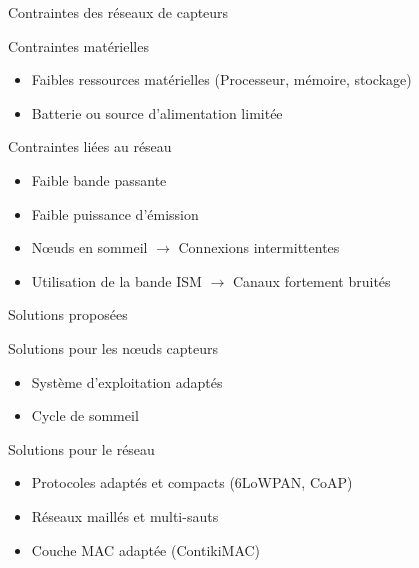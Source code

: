 \begin{frame}{Contraintes des réseaux de capteurs}

  \begin{block}{Contraintes matérielles}
    \begin{itemize}
      \item Faibles ressources matérielles (Processeur, mémoire, stockage)
      \item Batterie ou source d'alimentation limitée
    \end{itemize}
  \end{block}  

  \begin{block}{Contraintes liées au réseau}
    \begin{itemize}
      \item Faible bande passante
      \item Faible puissance d'émission
      \item Nœuds en sommeil $\to$ Connexions intermittentes
      \item Utilisation de la bande ISM $\to$ Canaux fortement bruités
    \end{itemize}
  \end{block}

\end{frame}

\begin{frame}{Solutions proposées}

  \begin{block}{Solutions pour les nœuds capteurs}
    \begin{itemize}
      \item Système d'exploitation adaptés
      \item Cycle de sommeil
    \end{itemize}
  \end{block}

  \begin{block}{Solutions pour le réseau}
    \begin{itemize}
      \item Protocoles adaptés et compacts (6LoWPAN, CoAP)
      \item Réseaux maillés et multi-sauts
      \item Couche MAC adaptée (ContikiMAC)
    \end{itemize}
  \end{block}

\end{frame}

